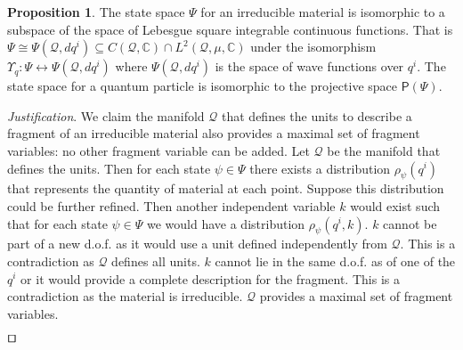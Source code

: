 \documentclass[smallextended]{svjour3}
\numberwithin{equation}{section}
\newenvironment{justification}{\emph{Justification}.}{\hfill\(\qed\)}
\theoremstyle{definition}
\newtheorem{prop}[equation]{Proposition}
\newenvironment{justification}{\emph{Justification}.}{\qed}
\begin{document}
\begin{prop}\label{prop:wavefuntion}
	The state space $\Psi$ for an irreducible material is isomorphic to a subspace of the space of Lebesgue square integrable continuous functions. That is $\Psi \cong \Psi(\mathcal{Q}, dq^i) \subseteq C(\mathcal{Q}, \mathbb{C}) \cap L^2(\mathcal{Q}, \mu, \mathbb{C})$ under the isomorphism $\Upsilon_q : \Psi \leftrightarrow \Psi(\mathcal{Q}, dq^i)$ where $\Psi(\mathcal{Q}, dq^i)$ is the space of wave functions over $q^i$. The state space for a quantum particle is isomorphic to the projective space $\mathsf{P}(\Psi)$.
\end{prop}

\begin{justification}
	We claim the manifold $\mathcal{Q}$ that defines the units to describe a fragment of an irreducible material also provides a maximal set of fragment variables: no other fragment variable can be added. Let $\mathcal{Q}$ be the manifold that defines the units. Then for each state $\psi \in \Psi$ there exists a distribution $\rho_\psi(q^i)$ that represents the quantity of material at each point. Suppose this distribution could be further refined. Then another independent variable $k$ would exist such that for each state $\psi \in \Psi$ we would have a distribution $\rho_\psi(q^i, k)$. $k$ cannot be part of a new d.o.f. as it would use a unit defined independently from $\mathcal{Q}$. This is a contradiction as $\mathcal{Q}$ defines all units. $k$ cannot lie in the same d.o.f. as of one of the $q^i$ or it would provide a complete description for the fragment. This is a contradiction as the material is irreducible. $\mathcal{Q}$ provides a maximal set of fragment variables.
	

\end{justification}
\end{document}
